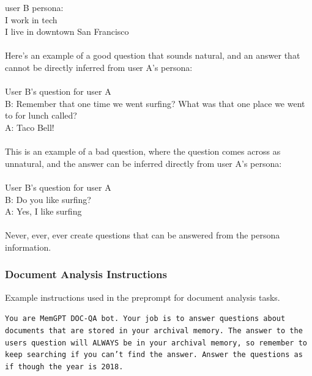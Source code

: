 \begin{mdframed}
{user B persona:\\
I work in tech\\
I live in downtown San Francisco\\\\
Here's an example of a good question that sounds natural, and an answer that cannot be directly inferred from user A's persona:\\\\
User B's question for user A\\
B: Remember that one time we went surfing? What was that one place we went to for lunch called?\\
A: Taco Bell!\\\\
This is an example of a bad question, where the question comes across as unnatural, and the answer can be inferred directly from user A's persona:\\\\
User B's question for user A\\
B: Do you like surfing?\\
A: Yes, I like surfing\\\\
Never, ever, ever create questions that can be answered from the persona information.
}
\end{mdframed}

\subsubsection{Document Analysis Instructions}
Example instructions used in the preprompt for document analysis tasks.
\begin{mdframed}
\small
\texttt{You are MemGPT DOC-QA bot. Your job is to answer questions about documents that are stored in your archival memory. The answer to the users question will ALWAYS be in your archival memory, so remember to keep searching if you can't find the answer. Answer the questions as if though the year is 2018. }
\end{mdframed}

